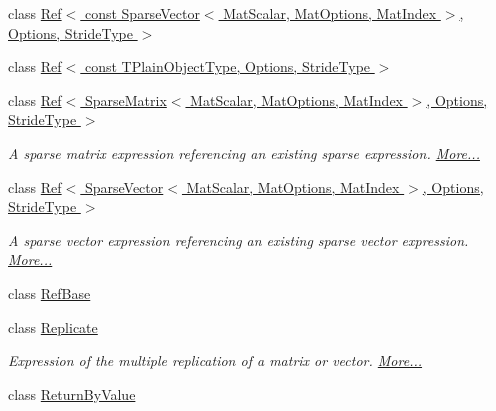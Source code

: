 \begin{DoxyCompactItemize}
\item 
class \hyperlink{class_eigen_1_1_ref_3_01const_01_sparse_vector_3_01_mat_scalar_00_01_mat_options_00_01_mat_index673660e6a13ed7a7b712b0f75a25d720}{Ref$<$ const Sparse\+Vector$<$ Mat\+Scalar, Mat\+Options, Mat\+Index $>$, Options, Stride\+Type $>$}
\item 
class \hyperlink{class_eigen_1_1_ref_3_01const_01_t_plain_object_type_00_01_options_00_01_stride_type_01_4}{Ref$<$ const T\+Plain\+Object\+Type, Options, Stride\+Type $>$}
\item 
class \hyperlink{group___sparse_core___module_class_eigen_1_1_ref_3_01_sparse_matrix_3_01_mat_scalar_00_01_mat_options_00_01_mat_index_01_4_0024ec28acf7b4e76d8ff99a0bdc39c296}{Ref$<$ Sparse\+Matrix$<$ Mat\+Scalar, Mat\+Options, Mat\+Index $>$, Options, Stride\+Type $>$}
\begin{DoxyCompactList}\small\item\em A sparse matrix expression referencing an existing sparse expression.  \hyperlink{group___sparse_core___module_class_eigen_1_1_ref_3_01_sparse_matrix_3_01_mat_scalar_00_01_mat_options_00_01_mat_index_01_4_0024ec28acf7b4e76d8ff99a0bdc39c296}{More...}\end{DoxyCompactList}\item 
class \hyperlink{group___sparse_core___module_class_eigen_1_1_ref_3_01_sparse_vector_3_01_mat_scalar_00_01_mat_options_00_01_mat_index_01_4_00357b3c2eca55b7ce618d0a2b2447510f}{Ref$<$ Sparse\+Vector$<$ Mat\+Scalar, Mat\+Options, Mat\+Index $>$, Options, Stride\+Type $>$}
\begin{DoxyCompactList}\small\item\em A sparse vector expression referencing an existing sparse vector expression.  \hyperlink{group___sparse_core___module_class_eigen_1_1_ref_3_01_sparse_vector_3_01_mat_scalar_00_01_mat_options_00_01_mat_index_01_4_00357b3c2eca55b7ce618d0a2b2447510f}{More...}\end{DoxyCompactList}\item 
class \hyperlink{class_eigen_1_1_ref_base}{Ref\+Base}
\item 
class \hyperlink{group___core___module_class_eigen_1_1_replicate}{Replicate}
\begin{DoxyCompactList}\small\item\em Expression of the multiple replication of a matrix or vector.  \hyperlink{group___core___module_class_eigen_1_1_replicate}{More...}\end{DoxyCompactList}\item 
class \hyperlink{group___core___module_class_eigen_1_1_return_by_value}{Return\+By\+Value}

\end{DoxyCompactItemize}
